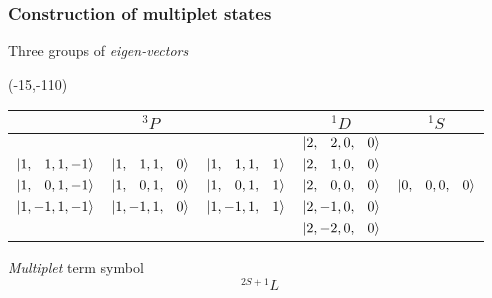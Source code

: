 \begin{frame}[t]
  \frametitle{Construction of multiplet states}
  \footnotesize
  Three groups of \emph{eigen-vectors}
  
  \Put(-15,-110){
  \begin{tabular}{|c c c|c|c|}
  \hline
  & $^3P$ &  & $^1D$ & $^1S$  \\ \hline
  &  &  & $\Ket{2,\phantom{-}2,0,\phantom{-}0}$ & \\
  $\Ket{1,\phantom{-}1,1,-1}$ & $\Ket{1,\phantom{-}1,1,\phantom{-}0}$ & $\Ket{1,\phantom{-}1,1,\phantom{-}1}$ & $\Ket{2,\phantom{-}1,0,\phantom{-}0}$ & \\
  $\Ket{1,\phantom{-}0,1,-1}$ & $\Ket{1,\phantom{-}0,1,\phantom{-}0}$ & $\Ket{1,\phantom{-}0,1,\phantom{-}1}$ & $\Ket{2,\phantom{-}0,0,\phantom{-}0}$ & $\Ket{0,\phantom{-}0,0,\phantom{-}0}$ \\
  $\Ket{1,-1,1,-1}$ & $\Ket{1,-1,1,\phantom{-}0}$ & $\Ket{1,-1,1,\phantom{-}1}$ & $\Ket{2,-1,0,\phantom{-}0}$ & \\
  &  &  & $\Ket{2,-2,0,\phantom{-}0}$ & \\
  \hline
  \end{tabular}}
  
  \vspace{8.2em}
  \emph{Multiplet} term symbol
  {\LARGE \emph{\[^{2S+1}L\]}}
\end{frame}

